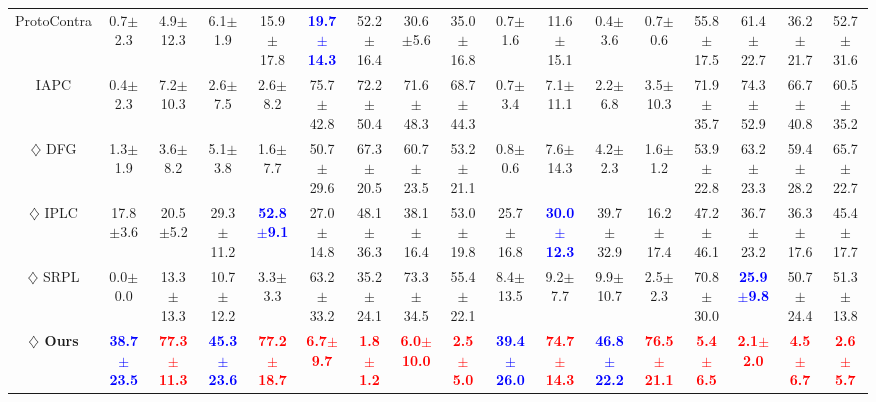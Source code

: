 \begin{table}[tbp]
{\begin{tabular}{@{}c@{\hspace{0.3cm}} cccccccc cccccccc@{}}
ProtoContra \cite{protocontra} & 0.7$\pm$2.3 & 4.9$\pm$12.3 & 6.1$\pm$1.9 & 15.9$\pm$17.8 & \textcolor{blue}{\textbf{19.7$\pm$14.3}} & 52.2$\pm$16.4 & 30.6$\pm$5.6 & {35.0$\pm$16.8} & 0.7$\pm$1.6 & 11.6$\pm$15.1 & 0.4$\pm$3.6 & 0.7$\pm$0.6 & {55.8$\pm$17.5} & 61.4$\pm$22.7 & 36.2$\pm$21.7 & 52.7$\pm$31.6 \\

IAPC \cite{IAPC} & 0.4$\pm$2.3 & {7.2$\pm$10.3} & 2.6$\pm$7.5 & 2.6$\pm$8.2 & 75.7$\pm$42.8 & {72.2$\pm$50.4} & 71.6$\pm$48.3 & 68.7$\pm$44.3 & 0.7$\pm$3.4 & {7.1$\pm$11.1} & 2.2$\pm$6.8 & 3.5$\pm$10.3 & 71.9$\pm$35.7 & 74.3$\pm$52.9 & 66.7$\pm$40.8 & 60.5$\pm$35.2 \\

$\diamondsuit$ DFG \cite{DFG} & {1.3$\pm$1.9} & 3.6$\pm$8.2 & 5.1$\pm$3.8 & 1.6$\pm$7.7 & {50.7$\pm$29.6} & 67.3$\pm$20.5 & {60.7$\pm$23.5} & 53.2$\pm$21.1 & {0.8$\pm$0.6} & 7.6$\pm$14.3 & {4.2$\pm$2.3} & {1.6$\pm$1.2} & 53.9$\pm$22.8 & 63.2$\pm$23.3 & {59.4$\pm$28.2} & {65.7$\pm$22.7} \\

$\diamondsuit$ IPLC \cite{iplc} & 17.8$\pm$3.6 & 20.5$\pm$5.2 & 29.3$\pm$11.2 & \textcolor{blue}{\textbf{52.8$\pm$9.1}} & 27.0$\pm$14.8 & 48.1$\pm$36.3 & 38.1$\pm$16.4 & 53.0$\pm$19.8 & 25.7$\pm$16.8 & \textcolor{blue}{\textbf{30.0$\pm$12.3}} & 39.7$\pm$32.9 & 16.2$\pm$17.4 & 47.2$\pm$46.1 & 36.7$\pm$23.2 & 36.3$\pm$17.6 & 45.4$\pm$17.7 \\ 

$\diamondsuit$ SRPL \cite{SRPL}  & 0.0$\pm$0.0 & 13.3$\pm$13.3 & 10.7$\pm$12.2 & 3.3$\pm$3.3 & 63.2$\pm$33.2 & 35.2$\pm$24.1 & 73.3$\pm$34.5 & 55.4$\pm$22.1 & 8.4$\pm$13.5 & 9.2$\pm$7.7 & 9.9$\pm$10.7 & 2.5$\pm$2.3 & 70.8$\pm$30.0 & \textcolor{blue}{\textbf{25.9$\pm$9.8}} & 50.7$\pm$24.4 & 51.3$\pm$13.8\\ \midrule

\textbf{$\diamondsuit$ Ours} & \textcolor{blue}{\textbf{38.7$\pm$23.5}} & \textcolor{red}{\textbf{77.3$\pm$11.3}} & \textcolor{blue}{\textbf{45.3$\pm$23.6}} & \textcolor{red}{\textbf{77.2$\pm$18.7}}& \textcolor{red}{\textbf{6.7$\pm$9.7}} & \textcolor{red}{\textbf{1.8$\pm$1.2}}& \textcolor{red}{\textbf{6.0$\pm$10.0}} & \textcolor{red}{\textbf{2.5$\pm$5.0}} & \textcolor{blue}{\textbf{39.4$\pm$26.0}} & \textcolor{red}{\textbf{74.7$\pm$14.3}} & \textcolor{blue}{\textbf{46.8$\pm$22.2}} & \textcolor{red}{\textbf{76.5$\pm$21.1}} & \textcolor{red}{\textbf{5.4$\pm$6.5}} & \textcolor{red}{\textbf{2.1$\pm$2.0}} & \textcolor{red}{\textbf{4.5$\pm$6.7}} & \textcolor{red}{\textbf{2.6$\pm$5.7}} \\ 



\end{tabular}}
\end{table}
